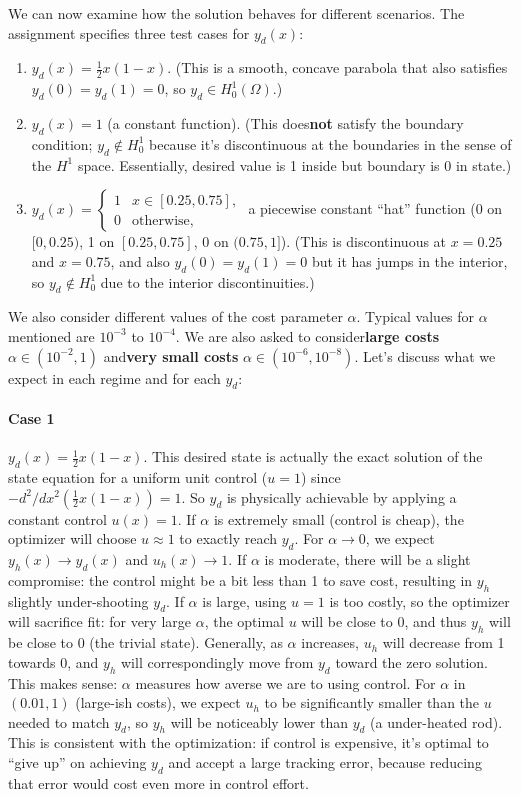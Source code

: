\documentclass[a4paper,10pt]{article}
\begin{document}
We can now examine how the solution behaves for different scenarios. The assignment specifies three test cases for \(y_d(x)\):
\begin{enumerate}
	\item \(y_d(x) = \frac{1}{2}x(1-x)\). (This is a smooth, concave parabola that also satisfies \(y_d(0)=y_d(1)=0\), so \(y_d \in H^1_0(\Omega)\).)
	\item \(y_d(x) = 1\) (a constant function). (This does\textbf{not} satisfy the boundary condition; \(y_d \notin H^1_0\) because it's discontinuous at the boundaries in the sense of the \(H^1\) space. Essentially, desired value is 1 inside but boundary is 0 in state.)
	\item \(y_d(x) = \begin{cases}1 & x\in[0.25,0.75], \\ 0 & \text{otherwise},\end{cases}\) a piecewise constant “hat” function (0 on \([0,0.25)\), 1 on \([0.25,0.75]\), 0 on \((0.75,1]\)). (This is discontinuous at \(x=0.25\) and \(x=0.75\), and also \(y_d(0)=y_d(1)=0\) but it has jumps in the interior, so \(y_d \notin H^1_0\) due to the interior discontinuities.)
\end{enumerate}
We also consider different values of the cost parameter \(\alpha\). Typical values for \(\alpha\) mentioned are \(10^{-3}\) to \(10^{-4}\). We are also asked to consider\textbf{large costs} \(\alpha \in (10^{-2}, 1)\) and\textbf{very small costs} \(\alpha \in (10^{-6}, 10^{-8})\).
Let's discuss what we expect in each regime and for each \(y_d\):

\paragraph{Case 1}
\(y_d(x)=\frac{1}{2}x(1-x)\).
This desired state is actually the exact solution of the state equation for a uniform unit control (\(u=1\)) since \(-d^2/dx^2(\frac{1}{2}x(1-x)) = 1\). So \(y_d\) is physically achievable by applying a constant control \(u(x)=1\). If \(\alpha\) is extremely small (control is cheap), the optimizer will choose \(u \approx 1\) to exactly reach \(y_d\). For \(\alpha \to 0\), we expect \(y_h(x) \to y_d(x)\) and \(u_h(x) \to 1\). If \(\alpha\) is moderate, there will be a slight compromise: the control might be a bit less than 1 to save cost, resulting in \(y_h\) slightly under-shooting \(y_d\). If \(\alpha\) is large, using \(u=1\) is too costly, so the optimizer will sacrifice fit: for very large \(\alpha\), the optimal \(u\) will be close to 0, and thus \(y_h\) will be close to 0 (the trivial state). Generally, as \(\alpha\) increases, \(u_h\) will decrease from 1 towards 0, and \(y_h\) will correspondingly move from \(y_d\) toward the zero solution. This makes sense: \(\alpha\) measures how averse we are to using control. For \(\alpha\) in \((0.01,1)\) (large-ish costs), we expect \(u_h\) to be significantly smaller than the \(u\) needed to match \(y_d\), so \(y_h\) will be noticeably lower than \(y_d\) (a under-heated rod). This is consistent with the optimization: if control is expensive, it's optimal to “give up” on achieving \(y_d\) and accept a large tracking error, because reducing that error would cost even more in control effort.
\end{document}
